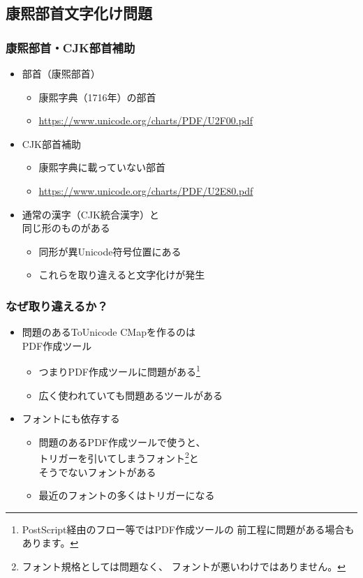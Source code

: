 \subsection{康熙部首文字化け問題}
\begin{frame}\frametitle{康熙部首・CJK部首補助}
  \begin{itemize}
  \item {}部首（康煕部首）
    \begin{itemize}
    \item 康熙字典（1716年）の部首
    \item \scriptsize
      \url{https://www.unicode.org/charts/PDF/U2F00.pdf}
    \end{itemize}
  \item CJK部首補助
    \begin{itemize}
    \item 康熙字典に載っていない部首
    \item \scriptsize
      \url{https://www.unicode.org/charts/PDF/U2E80.pdf}
    \end{itemize}

    \vspace{1\zh}

  \item 通常の漢字（CJK統合漢字）と \\ 同じ形のものがある
    \begin{itemize}
    \item 同形が異Unicode符号位置にある
    \item これらを取り違えると文字化けが発生
    \end{itemize}
  \end{itemize}
\end{frame}

\begin{frame}\frametitle{なぜ取り違えるか？}
  \begin{itemize}
  \item 問題のあるToUnicode CMapを作るのは \\ PDF作成ツール
    \begin{itemize}
    \item つまりPDF作成ツールに問題がある\footnote{\tiny
    PostScript経由のフロー等ではPDF作成ツールの
    前工程に問題がある場合もあります。}
    \item 広く使われていても問題あるツールがある
    \end{itemize}
  \item フォントにも依存する
    \begin{itemize}
    \item 問題のあるPDF作成ツールで使うと、 \\
      トリガーを引いてしまうフォント\footnote{\tiny
      フォント規格としては問題なく、
      フォントが悪いわけではありません。}と \\
      そうでないフォントがある
    \item 最近のフォントの多くはトリガーになる
    \end{itemize}
  \end{itemize}
\end{frame}


